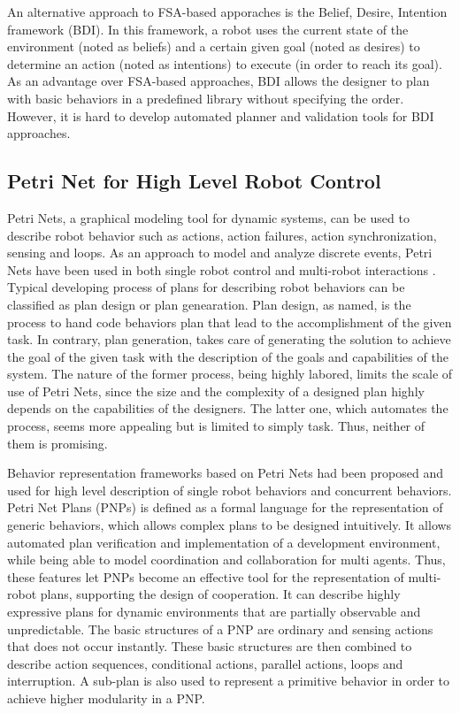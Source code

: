 \documentclass[12pt,a4paper,twocolumn]{article}
\begin{document}
An alternative approach to FSA-based apporaches is the Belief, Desire, Intention framework (BDI). In this framework, a robot uses the current state of the environment (noted as beliefs) and a certain given goal (noted as desires) to determine an action (noted as intentions) to execute (in order to reach its goal). As an advantage over FSA-based approaches, BDI allows the designer to plan with basic behaviors in a predefined library without specifying the order. However, it is hard to develop automated planner and validation tools for BDI approaches.  

\subsection{Petri Net for High Level Robot Control}

Petri Nets, a graphical modeling tool for dynamic systems, can be used to describe robot behavior such as actions, action failures, action synchronization, sensing and loops. As an approach to model and analyze discrete events, Petri Nets have been used in both single robot control \cite{costelha2007modelling} and multi-robot interactions \cite{sheng2005peer}\cite{palamara2009teamwork}. Typical developing process of plans for describing robot behaviors can be classified as plan design or plan genearation. Plan design, as named, is the process to hand code behaviors plan that lead to the accomplishment of the given task. In contrary, plan generation, takes care of generating the solution to achieve the goal of the given task with the description of the goals and capabilities of the system. The nature of the former process, being highly labored, limits the scale of use of Petri Nets, since the size and the complexity of a designed plan highly depends on the capabilities of the designers. The latter one, which automates the process, seems more appealing but is limited to simply task. Thus, neither of them is promising. 

Behavior representation frameworks based on Petri Nets \cite{ziparo2011petri} had been proposed and used for high level description of single robot behaviors and concurrent behaviors. Petri Net Plans (PNPs) \cite{ziparo2011petri} is defined as a formal language for the representation of generic behaviors, which allows complex plans to be designed intuitively. It allows automated plan verification and implementation of a development environment, while being able to model coordination and collaboration for multi agents. Thus, these features let PNPs become an effective tool for the representation of multi-robot plans, supporting the design of cooperation. It can describe highly expressive plans for dynamic environments that are partially observable and unpredictable. The basic structures of a PNP are ordinary and sensing actions that does not occur instantly. These basic structures are then combined to describe action sequences, conditional actions, parallel actions, loops and interruption. A sub-plan is also used to represent a primitive behavior in order to achieve higher modularity in a PNP. 
\end{document}
